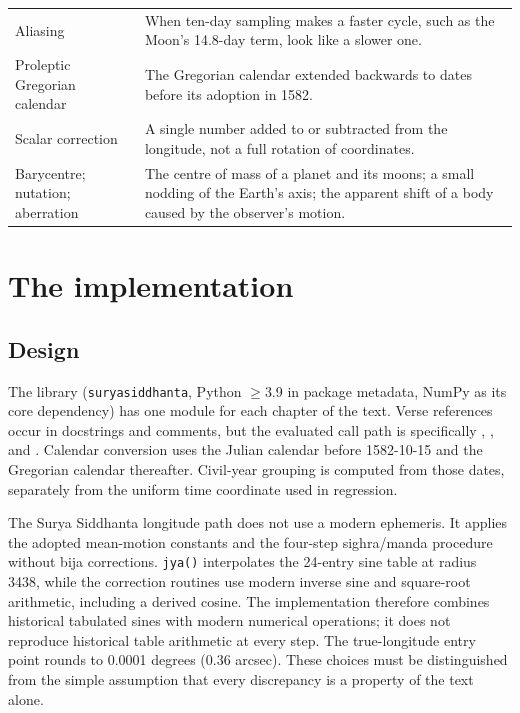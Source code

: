 \documentclass[11pt,a4paper]{article}
\newcommand{\bottomrule}{\hline\hline}}
\newcommand{\file}[1]{\texttt{#1}}
\begin{document}
{\begin{longtable}{@{}>{\raggedright\arraybackslash}p{}>{\raggedright\arraybackslash}p{}@{}}
Aliasing & When ten-day sampling makes a faster cycle, such as the Moon's 14.8-day term, look like a slower one. \\
Proleptic Gregorian calendar & The Gregorian calendar extended backwards to dates before its adoption in 1582. \\
Scalar correction & A single number added to or subtracted from the longitude, not a full rotation of coordinates. \\
Barycentre; nutation; aberration & The centre of mass of a planet and its moons; a small nodding of the Earth's axis; the apparent shift of a body caused by the observer's motion. \\
\bottomrule
\end{longtable}
\addtocounter{table}{-1}%
}

\section{The implementation}
\label{sec:impl}

\subsection{Design}

The library (\file{suryasiddhanta}, Python $\geq$3.9 in package metadata, NumPy as its core dependency) has one module for each chapter of the text. Verse references occur in docstrings and comments, but the evaluated call path is specifically , , and . Calendar conversion uses the Julian calendar before 1582-10-15 and the Gregorian calendar thereafter. Civil-year grouping is computed from those dates, separately from the uniform time coordinate used in regression.

The Surya Siddhanta longitude path does not use a modern ephemeris. It applies the adopted mean-motion constants and the four-step sighra/manda procedure without bija corrections. \file{jya()} interpolates the 24-entry sine table at radius 3438, while the correction routines use modern inverse sine and square-root arithmetic, including a derived cosine. The implementation therefore combines historical tabulated sines with modern numerical operations; it does not reproduce historical table arithmetic at every step. The true-longitude entry point rounds to 0.0001 degrees (0.36 arcsec). These choices must be distinguished from the simple assumption that every discrepancy is a property of the text alone.
\end{document}
